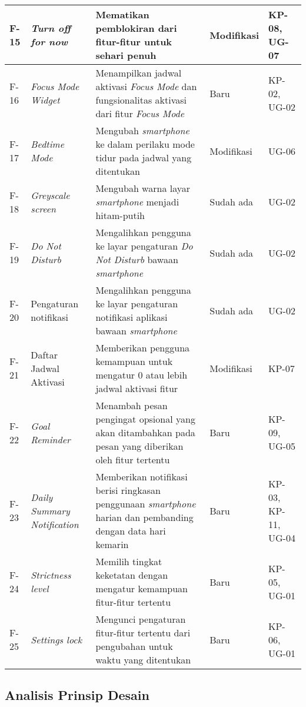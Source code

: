 \begin{small}
\begin{longtable}[c]{|W{c}{0.06\textwidth}|>{\cccnormspacingcenter}m{0.15\textwidth}|>{\cccnormspacing}m{0.35\textwidth}|>{\cccnormspacingcenter}m{0.12\textwidth}|>{\cccnormspacingcenter}m{0.16\textwidth}|}
  F-15 & \textit{Turn off for now} & Mematikan pemblokiran dari fitur-fitur untuk sehari penuh & Modifikasi & KP-08, UG-07 \\ \hline
  F-16 & \textit{Focus Mode Widget} & Menampilkan jadwal aktivasi \textit{Focus Mode} dan fungsionalitas aktivasi dari fitur \textit{Focus Mode} & Baru & KP-02, UG-02 \\ \hline
  F-17 & \textit{Bedtime Mode} & Mengubah \textit{smartphone} ke dalam perilaku mode tidur pada jadwal yang ditentukan & Modifikasi & UG-06 \\ \hline
  F-18 & \textit{Greyscale screen} & Mengubah warna layar \textit{smartphone} menjadi hitam-putih & Sudah ada & UG-02 \\ \hline
  F-19 & \textit{Do Not Disturb} & Mengalihkan pengguna ke layar pengaturan \textit{Do Not Disturb} bawaan \textit{smartphone} & Sudah ada & UG-02 \\ \hline
  F-20 & Pengaturan notifikasi & Mengalihkan pengguna ke layar pengaturan notifikasi aplikasi bawaan \textit{smartphone} & Sudah ada & UG-02 \\ \hline
  F-21 & Daftar Jadwal Aktivasi & Memberikan pengguna kemampuan untuk mengatur 0 atau lebih jadwal aktivasi fitur & Modifikasi & KP-07 \\ \hline
  F-22 & \textit{Goal Reminder} & Menambah pesan pengingat opsional yang akan ditambahkan pada pesan yang diberikan oleh fitur tertentu & Baru & KP-09, UG-05 \\ \hline
  F-23 & \textit{Daily Summary Notification} & Memberikan notifikasi berisi ringkasan penggunaan \textit{smartphone} harian dan pembanding dengan data hari kemarin & Baru & KP-03, KP-11, UG-04 \\ \hline
  F-24 & \textit{Strictness level} & Memilih tingkat keketatan dengan mengatur kemampuan fitur-fitur tertentu & Baru & KP-05, UG-01 \\ \hline
  F-25 & \textit{Settings lock} & Mengunci pengaturan fitur-fitur tertentu dari pengubahan untuk waktu yang ditentukan & Baru & KP-06, UG-01 \\ \hline

\end{longtable}
\end{small}
\justifying
\FloatBarrier

\subsection{Analisis Prinsip Desain}


